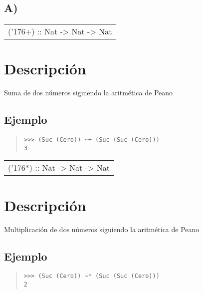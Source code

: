 \subsection{A)}
\begin{haddockdesc}
\item[\begin{tabular}{@{}l}
({\char '176}+) :: Nat -> Nat -> Nat
\end{tabular}]
{\haddockbegindoc
\section*{Descripción}
Suma de dos números siguiendo la aritmética de Peano\par
\subsection*{Ejemplo}
\begin{quote}
{\haddockverb\begin{verbatim}
>>> (Suc (Cero)) ~+ (Suc (Suc (Cero)))
3

\end{verbatim}}
\end{quote}}
\end{haddockdesc}
\begin{haddockdesc}
\item[\begin{tabular}{@{}l}
({\char '176}*) :: Nat -> Nat -> Nat
\end{tabular}]
{\haddockbegindoc
\section*{Descripción}
Multiplicación de dos números siguiendo la aritmética de Peano\par
\subsection*{Ejemplo}
\begin{quote}
{\haddockverb\begin{verbatim}
>>> (Suc (Cero)) ~* (Suc (Suc (Cero)))
2

\end{verbatim}}
\end{quote}}
\end{haddockdesc}
